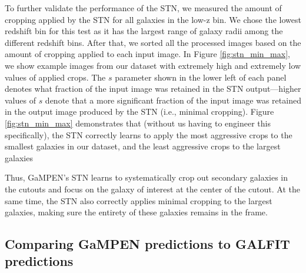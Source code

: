 \documentclass[linenumbers,twocolumn,twocolappendix]{aastex631}
\newcommand\gampen{GaMPEN}
\begin{document}
\begin{CJK*}{UTF8}{gbsn}
To further validate the performance of the STN, we measured the amount of cropping applied by the STN for all galaxies in the low-z bin. We chose the lowest redshift bin for this test as it has the largest range of galaxy radii among the different redshift bins. After that, we sorted all the processed images based on the amount of cropping applied to each input image. In Figure \ref{fig:stn_min_max}, we show example images from our dataset with extremely high and extremely low values of applied crops. The $s$ parameter shown in the lower left of each panel denotes what fraction of the input image was retained in the STN output---higher values of $s$ denote that a more significant fraction of the input image was retained in the output image produced by the STN  (i.e., minimal cropping). Figure \ref{fig:stn_min_max} demonstrates that (without us having to engineer this specifically), the STN correctly learns to apply the most aggressive crops to the smallest galaxies in our dataset, and the least aggressive crops to the largest galaxies

Thus, \gampen{}'s STN learns to systematically crop out secondary galaxies in the cutouts and focus on the galaxy of interest at the center of the cutout. At the same time, the STN also correctly applies minimal cropping to the largest galaxies, making sure the entirety of these galaxies remains in the frame. 

\subsection{Comparing \gampen{} predictions to GALFIT predictions} \label{sec:gampen_v_galfit}


\end{CJK*}
\end{document}
